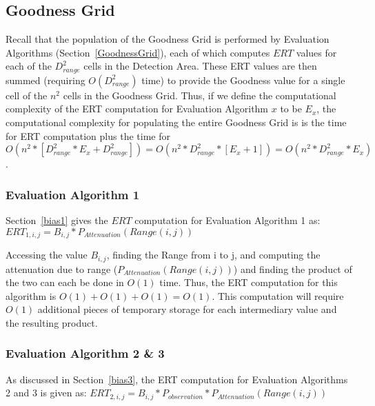 \subsection{Goodness Grid}
Recall that the population of the Goodness Grid is performed by Evaluation Algorithms (Section~\ref{GoodnessGrid}), each of which computes $ERT$ values for each of the $D_{range}^2$ cells in the Detection Area.  These ERT values are then summed (requiring $O(D_{range}^2)$  time) to provide the Goodness value for a single cell of the $n^2$ cells in the Goodness Grid.  Thus, if we define the computational complexity of the ERT computation for Evaluation Algorithm $x$ to be $E_x$, the computational complexity for populating the entire Goodness Grid is is the time for ERT computation plus the time for  $O(n^2 * [D_{range}^2* E_x + D_{range}^2]) = O(n^2 * D_{range}^2 * [E_x + 1]) = O(n^2 * D_{range}^2 * E_x)$. 


\subsubsection{Evaluation Algorithm 1}
\label{bigObias1}
Section~\ref{bias1} gives the $ERT$ computation for Evaluation Algorithm 1 as:\newline
$ERT_{1,i,j} = B_{i,j} * P_{Attenuation}(Range(i,j))$

Accessing the value $ B_{i,j}$, finding the Range from i to j, and computing the attenuation due to range ($P_{Attenuation}(Range(i,j))$) and finding the product of the two can each be done in $O(1)$ time.  Thus, the ERT computation for this algorithm is $O(1) + O(1) + O(1) = O(1)$.  This computation will require $O(1)$ additional pieces of temporary storage for each intermediary value and the resulting product.


\subsubsection{Evaluation Algorithm 2 \& 3}
\label{bigObias23}
As discussed in Section~\ref{bias3}, the ERT computation for Evaluation Algorithms 2 and 3 is given as:\newline
$ERT_{2,i,j} =  B_{i,j} * P_{observation} * P_{Attenuation}(Range(i,j))$\newline

